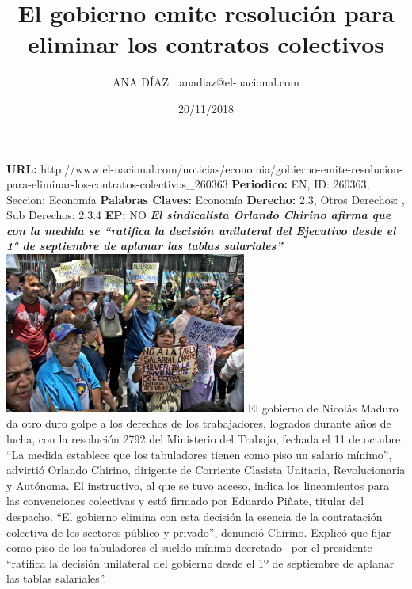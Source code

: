 \documentclass{article}%
\title{\textbf{El gobierno emite resolución para eliminar los contratos colectivos}}%
\author{ANA DÍAZ | anadiaz@el{-}nacional.com}%
\date{20/11/2018}%
\begin{document}
%
\normalsize%
\maketitle%
\textbf{URL: }%
http://www.el{-}nacional.com/noticias/economia/gobierno{-}emite{-}resolucion{-}para{-}eliminar{-}los{-}contratos{-}colectivos\_260363\newline%
%
\textbf{Periodico: }%
EN, %
ID: %
260363, %
Seccion: %
Economía\newline%
%
\textbf{Palabras Claves: }%
Economía\newline%
%
\textbf{Derecho: }%
2.3, %
Otros Derechos: %
, %
Sub Derechos: %
2.3.4\newline%
%
\textbf{EP: }%
NO\newline%
\newline%
%
\textbf{\textit{El sindicalista Orlando Chirino afirma que con la medida se “ratifica la decisión unilateral del Ejecutivo desde el 1° de septiembre de aplanar las tablas salariales”}}%
\newline%
\newline%
%
\includegraphics[width=300px]{38.jpg}%
\newline%
%
El gobierno de Nicolás Maduro da otro duro golpe a los derechos de los trabajadores, logrados durante años de lucha, con la resolución 2792 del Ministerio del Trabajo, fechada el 11 de octubre. “La medida establece que los tabuladores tienen como piso un salario mínimo”, advirtió Orlando Chirino, dirigente de Corriente Clasista Unitaria, Revolucionaria y Autónoma.%
\newline%
%
El instructivo, al que se tuvo acceso, indica los lineamientos para las convenciones colectivas y está firmado por Eduardo Piñate, titular del despacho. “El gobierno elimina con esta decisión la esencia de la contratación colectiva de los sectores público y privado”, denunció Chirino.%
\newline%
%
Explicó que fijar como piso de los tabuladores el sueldo mínimo decretado ~por el presidente “ratifica la decisión unilateral del gobierno desde el 1º de septiembre de aplanar las tablas salariales”.%
\end{document}
